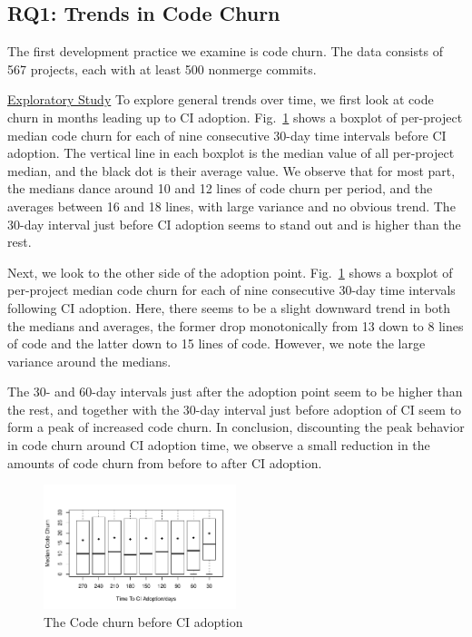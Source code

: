 \documentclass[conference]{IEEEtran}
\begin{document}
\subsection{RQ1: Trends in Code Churn}

The first development practice we examine is code churn.
The data consists of 567 projects, each with at least 500 nonmerge commits.

\noindent \underline{Exploratory Study} To explore general trends over time, we first look at code churn in months leading up to CI adoption.
Fig.~\ref{Fig:CodeChurnBefore} shows a boxplot of per-project median code churn for each of nine consecutive 30-day time intervals before CI adoption.
The vertical line in each boxplot is the median value of all per-project median, and the black dot is their average value.
We observe that for most part, the medians dance around 
10 and 12 lines of code churn per period, and the averages between 16 and 18 lines, with large variance and no obvious trend. The 30-day interval just before CI adoption seems to stand out and is higher than the rest.

Next, we look to the other side of the adoption point. Fig.~\ref{Fig:CodeChurnBefore} shows a boxplot of per-project median code churn for each of nine consecutive 30-day time intervals following CI adoption.
Here,  there seems to be a slight downward trend in both the medians and averages, the former drop monotonically from 13 down to 8 lines of code and the latter down to 15 lines of code.
However, we note the large variance around the medians.

The 30- and 60-day intervals just after the adoption point seem to be higher than the rest, and together with the 30-day interval just before adoption of CI seem to form a peak of increased code churn.
In conclusion, discounting the peak behavior in code churn around CI adoption time, we observe a small reduction in the amounts of code churn from before to after CI adoption.


\begin{figure}[!t]
\centering
\includegraphics[width=0.5\textwidth]{churn_before.pdf}
\caption{The Code churn before CI adoption}
\label{Fig:CodeChurnBefore}
\end{figure}
\end{document}
